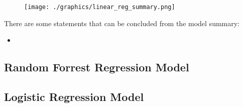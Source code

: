 \begin{figure}[H]
    \centering
    \texttt{[image: ./graphics/linear\_reg\_summary.png]}
    \label{fig:linear_reg_summary}
\end{figure}
There are some statements that can be concluded from the model summary:
\begin{itemize}
    \item 
\end{itemize}















\subsection{Random Forrest Regression Model}
\label{section:data_analysis_randomforrest}









\subsection{Logistic Regression Model}
\label{section:data_analysis_logistic}